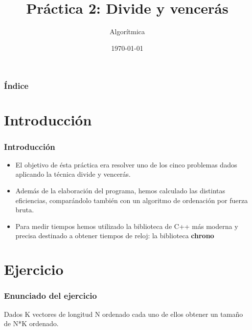 \documentclass{beamer}
\title[Practica 1]{Práctica 2: Divide y vencerás} %
\author{Algorítmica} %
\institute[UGR] %
{
Universidad de Granada \\ %
\medskip

}
\date{\today} %
\begin{document}
\begin{frame}
\titlepage %
\end{frame}

\begin{frame}
\frametitle{Índice} %
\tableofcontents %
\end{frame}


\section{Introducción }
\begin{frame}
	\frametitle{Introducción}
	\begin{itemize}
		\item El objetivo de ésta práctica era resolver uno de los cinco problemas dados aplicando la técnica divide y vencerás.
		\item Además de la elaboración del programa, hemos calculado las distintas eficiencias, comparándolo también con un algoritmo de ordenación por fuerza bruta.
		\item Para medir tiempos hemos utilizado la biblioteca de C++ más moderna y precisa destinado a obtener tiempos de reloj: la biblioteca \textbf{chrono}
	
	\end{itemize}
\end{frame}


\section{Ejercicio} %
\begin{frame}
	\frametitle{Enunciado del ejercicio}
	Dados K vectores de longitud N ordenado cada uno de ellos obtener un tamaño de N*K ordenado.
\end{frame}
\end{document}
